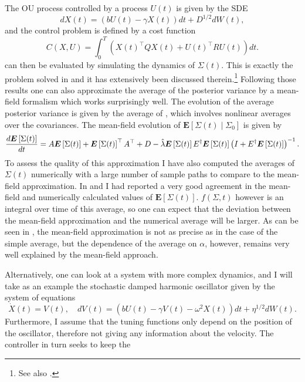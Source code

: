 The OU process controlled by a process $U(t)$ is given by the SDE
\[
dX(t) = (b U(t)-\gamma X(t)) dt + D^{1/2}dW(t),
\]
and the control problem is defined by a cost function
\[
C(X,U) = \int_0^T \left(X(t)^\top Q X(t) + U(t)^\top R U(t)\right)dt.
\]
 can then be evaluated by simulating the dynamics of
$\Sigma(t)$. This is exactly the problem solved in  and it has extensively been discussed therein.\footnote{See also .}
Following those results one can also approximate the average of the posterior variance by a mean-field formalism which works surprisingly well. The evolution of the 
average posterior variance is given by the average
of , which involves nonlinear averages over the covariances. The mean-field evolution of 
$\boldsymbol{E}\left[\Sigma(t)\middle| \Sigma_0\right]$ is given by
\[
\frac{d\boldsymbol{E}\left[\Sigma(t)\right]}{dt} = A \boldsymbol{E}\left[\Sigma(t)\right] + \boldsymbol{E}\left[\Sigma(t)\right]^\top A^\top + D - \hat{\lambda}  \boldsymbol{E}\left[\Sigma(t)\right]E^\dagger  \boldsymbol{E}\left[\Sigma(t)\right] \left(I+E^\dagger  \boldsymbol{E}\left[\Sigma(t)\right]\right)^{-1}.
\]
To assess the quality of this approximation I have also computed the averages of $\Sigma(t)$ numerically with a large number of sample paths to compare to the
mean-field approximation. In  and  I had reported a very good agreement in the mean-field and numerically calculated 
values of $ \boldsymbol{E}\left[\Sigma(t)\right]$. $f(\Sigma,t)$ however is an integral over time of this average, so one can expect that the deviation between the mean-field approximation and the 
numerical average will be larger. As can be seen in , the mean-field approximation is not as precise as in the case
of the simple average, but the dependence of the average on $\alpha$, however, remains very well explained by the mean-field approach.\par
Alternatively, one can look at a system with more complex dynamics, and I will take as an example the stochastic damped harmonic oscillator given by the system of equations
\begin{equation}
\label{eq:stoch_osc}
\dot{X}(t) = V(t),\quad dV(t)=\left(b U(t)-\gamma V(t)  - \omega^2 X(t) \right)dt + \eta^{1/2} dW(t).
\end{equation}
Furthermore, I assume that
the tuning functions only depend on the position of the oscillator, therefore not giving any information about the velocity. The controller in turn seeks to keep the
